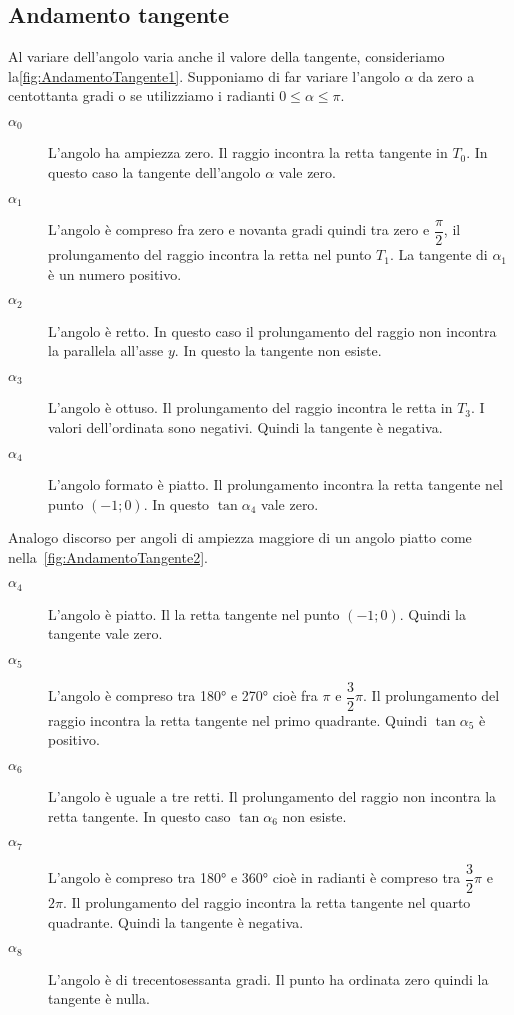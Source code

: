 \subsection{Andamento tangente}
\label{sec:AndamentoTangente}
Al variare dell'angolo varia anche il valore della tangente, consideriamo la\nobs\vref{fig:AndamentoTangente1}. Supponiamo di far variare l'angolo $\alpha$ da zero a centottanta gradi o se utilizziamo i radianti $0\leq\alpha\leq\pi$. 
\begin{description}
	\item[$\alpha_0$] L'angolo ha ampiezza zero. Il raggio incontra la retta tangente in $T_0$. In questo caso la tangente dell'angolo $\alpha$ vale zero.
	\item [$\alpha_1$] L'angolo è compreso fra zero e novanta gradi quindi tra zero e $\dfrac{\pi}{2}$, il prolungamento del raggio incontra la retta nel punto $T_1$. La tangente di $\alpha_1$ è un numero positivo.
	\item [$\alpha_2$] L'angolo è retto. In questo caso il prolungamento del raggio non incontra la parallela all'asse $y$. In questo la tangente non esiste. 
	\item [$\alpha_3$] L'angolo è ottuso. Il prolungamento del raggio incontra le retta in $T_3$. I valori dell'ordinata sono negativi. Quindi la tangente è negativa.
	\item [$\alpha_4$] L'angolo formato è piatto. Il prolungamento incontra la retta tangente nel punto $(-1;0)$. In questo $\tan\alpha_4$ vale zero.
\end{description}
Analogo discorso per angoli di ampiezza maggiore di un angolo piatto come nella~\vref{fig:AndamentoTangente2}.
\begin{description}
	\item [$\alpha_4$] L'angolo è piatto. Il la retta tangente nel punto $(-1;0)$. Quindi la tangente vale zero.
	\item [$\alpha_5$] L'angolo è compreso tra \ang{180} e \ang{270} cioè fra $\pi$ e $\dfrac{3}{2}\pi$. Il prolungamento del raggio incontra la retta tangente nel primo quadrante. Quindi $\tan\alpha_5$ è positivo.
	\item [$\alpha_6$] L'angolo è uguale a tre retti. Il prolungamento del raggio non incontra la retta tangente. In questo caso $\tan\alpha_6$ non esiste. 
	\item [$\alpha_7$] L'angolo è compreso tra \ang{180} e \ang{360} cioè in radianti è compreso tra $\dfrac{3}{2}\pi$ e $2\pi$. Il prolungamento del raggio incontra la retta tangente nel quarto quadrante. Quindi la tangente è negativa.
	\item [$\alpha_8$] L'angolo è di trecentosessanta gradi. Il punto ha ordinata zero quindi la tangente è nulla.
\end{description}
